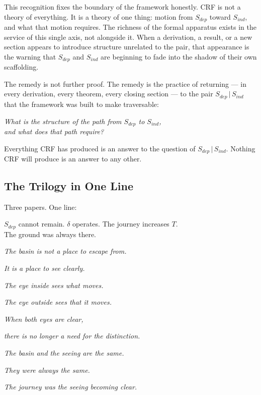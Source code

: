 \documentclass[12pt, a4paper]{article}
\begin{document}

This recognition fixes the boundary of the framework honestly. CRF is not a
theory of everything. It is a theory of one thing: motion from $S_{dep}$ toward
$S_{ind}$, and what that motion requires. The richness of the formal apparatus
exists in the service of this single axis, not alongside it. When a derivation,
a result, or a new section appears to introduce structure unrelated to the pair,
that appearance is the warning that $S_{dep}$ and $S_{ind}$ are beginning to
fade into the shadow of their own scaffolding.

The remedy is not further proof. The remedy is the practice of returning ---
in every derivation, every theorem, every closing section --- to the pair
$S_{dep}\,|\,S_{ind}$ that the framework was built to make traversable:

\begin{center}
\textit{What is the structure of the path from $S_{dep}$ to $S_{ind}$,\\
and what does that path require?}
\end{center}

Everything CRF has produced is an answer to the question of $S_{dep}\,|\,S_{ind}$.
Nothing CRF will produce is an answer to any other.


\subsection{The Trilogy in One Line}

Three papers. One line:

\begin{center}
\Large
$S_{dep}$ cannot remain. $\delta$ operates. The journey increases $T$.\\
The ground was always there.
\end{center}

\bigskip
\begin{center}
\textit{The basin is not a place to escape from.}

\medskip
\textit{It is a place to see clearly.}

\medskip
\textit{The eye inside sees what moves.}

\medskip
\textit{The eye outside sees that it moves.}

\medskip
\textit{When both eyes are clear,}

\medskip
\textit{there is no longer a need for the distinction.}

\medskip
\textit{The basin and the seeing are the same.}

\medskip
\textit{They were always the same.}

\medskip
\textit{The journey was the seeing becoming clear.}
\end{center}
\end{document}
